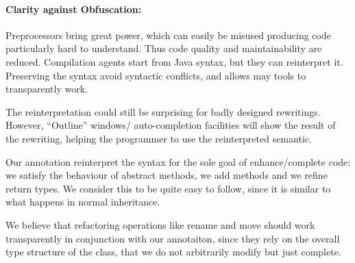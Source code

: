 \paragraph{Clarity against Obfuscation:}
Preprocessors bring great power, which can easily be misused producing
code particularly hard to understand. Thus code quality and maintainability are reduced.
Compilation agents start from Java syntax, but they can reinterpret it.
Preserving the syntax avoid syntactic conflicts, and allows may tools to transparently work.

The reinterpretation could still be surprising for badly designed rewritings.
However, ``Outline'' windows/ auto-completion facilities
will show the result of the rewriting, helping the programmer to use the reinterpreted semantic.

Our annotation reinterpret the syntax for the sole goal of enhance/complete code:
we satisfy the behaviour of abstract methods, we add methods and we refine return types.
We consider this to be quite easy to follow, since it is similar to what happens in normal inheritance.

We believe that refactoring operations like rename and move
should work transparently in conjunction with our annotaiton, since they rely on
the overall type structure of the class, that we do not arbitrarily modify but just complete.



